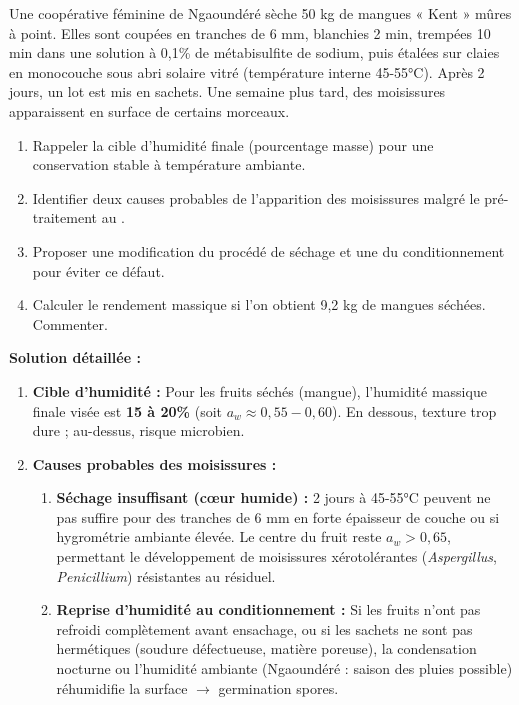 \documentclass[11pt]{article}
\begin{document}
\begin{exoresolu}
Une coopérative féminine de Ngaoundéré sèche 50 kg de mangues « Kent » mûres à point. Elles sont coupées en tranches de 6 mm, blanchies 2 min, trempées 10 min dans une solution à 0,1\% de métabisulfite de sodium, puis étalées sur claies en monocouche sous abri solaire vitré (température interne 45-55°C). Après 2 jours, un lot est mis en sachets. Une semaine plus tard, des moisissures apparaissent en surface de certains morceaux.
\begin{enumerate}
    \item Rappeler la cible d'humidité finale (pourcentage masse) pour une conservation stable à température ambiante.
    \item Identifier deux causes probables de l'apparition des moisissures malgré le pré-traitement au .
    \item Proposer une modification du procédé de séchage et une du conditionnement pour éviter ce défaut.
    \item Calculer le rendement massique si l'on obtient 9,2 kg de mangues séchées. Commenter.
\end{enumerate}
\tcblower
\textbf{Solution détaillée :}
\begin{enumerate}
    \item \textbf{Cible d'humidité :} Pour les fruits séchés (mangue), l'humidité massique finale visée est \textbf{15 à 20\%} (soit $a_w \approx 0{,}55-0{,}60$). En dessous, texture trop dure ; au-dessus, risque microbien.
    \item \textbf{Causes probables des moisissures :}
    \begin{enumerate}
        \item \textbf{Séchage insuffisant (cœur humide) :} 2 jours à 45-55°C peuvent ne pas suffire pour des tranches de 6 mm en forte épaisseur de couche ou si hygrométrie ambiante élevée. Le centre du fruit reste $a_w > 0{,}65$, permettant le développement de moisissures xérotolérantes (\emph{Aspergillus}, \emph{Penicillium}) résistantes au  résiduel.
        \item \textbf{Reprise d'humidité au conditionnement :} Si les fruits n'ont pas refroidi complètement avant ensachage, ou si les sachets ne sont pas hermétiques (soudure défectueuse, matière poreuse), la condensation nocturne ou l'humidité ambiante (Ngaoundéré : saison des pluies possible) réhumidifie la surface $\rightarrow$ germination spores.
    \end{enumerate}

\end{enumerate}
\end{exoresolu}
\end{document}

